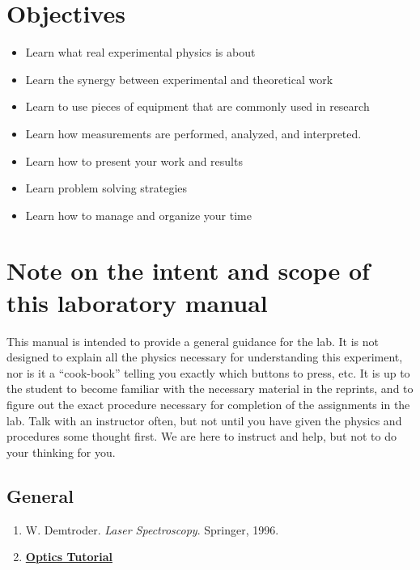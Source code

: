 \documentclass{../lab}
\begin{document}
\section{Objectives}

\begin{itemize}
    \item Learn what real experimental physics is about

    \item Learn the synergy between experimental and theoretical work

    \item Learn to use pieces of equipment that are commonly used in research

    \item Learn how measurements are performed, analyzed, and interpreted.

    \item Learn how to present your work and results

    \item Learn problem solving strategies

    \item Learn how to manage and organize your time

\end{itemize}

\section{Note on the intent and scope of this laboratory manual}

This manual is intended to provide a general guidance for the lab. It is not designed to explain all the physics necessary for understanding this experiment, nor is it a ``cook-book'' telling you exactly which buttons to press, etc. It is up to the student to become familiar with the necessary material in the reprints, and to figure out the exact procedure necessary for completion of the assignments in the lab. Talk with an instructor often, but not until you have given the physics and procedures some thought first. We are here to instruct and help, but not to do your thinking for you.

\subsection{General}

\begin{enumerate}
    \item W. Demtroder. \emph{Laser Spectroscopy}. Springer, 1996.

    \item \href{http://experimentationlab.berkeley.edu/OpticsTutorial}{\textbf{Optics Tutorial}}

\end{enumerate}
\end{document}
